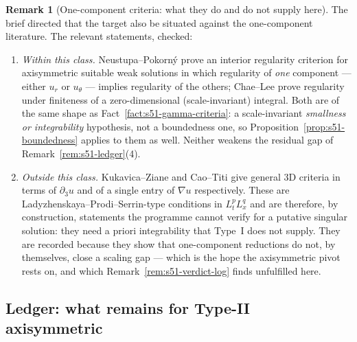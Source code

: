 \documentclass[11pt]{article}
\theoremstyle{definition}
\newtheorem{remark}[theorem]{Remark}
\theoremstyle{remark}
\begin{document}
\begin{remark}[One-component criteria: what they do and do not supply here]
  \label{rem:s51-onecomponent}
  The brief directed that the target also be situated against the
  one-component literature. The relevant statements, checked:
  \begin{enumerate}[label=\textup{(\alph*)},leftmargin=2.4em]
  \item \emph{Within this class.} Neustupa--Pokorn\'y
    \cite{NeustupaPokorny2000} prove an interior regularity criterion for
    axisymmetric suitable weak solutions in which regularity of \emph{one}
    component --- either $u_r$ or $u_\theta$ --- implies regularity of the
    others; Chae--Lee \cite{ChaeLee2002} prove regularity under finiteness of
    a zero-dimensional (scale-invariant) integral. Both are of the same shape
    as Fact~\ref{fact:s51-gamma-criteria}: a scale-invariant \emph{smallness
    or integrability} hypothesis, not a boundedness one, so
    Proposition~\ref{prop:s51-boundedness} applies to them as well. Neither
    weakens the residual gap of Remark~\ref{rem:s51-ledger}(4).
  \item \emph{Outside this class.} Kukavica--Ziane
    \cite{KukavicaZiane2006} and Cao--Titi \cite{CaoTiti2011} give general 3D
    criteria in terms of $\partial_3u$ and of a single entry of $\nabla u$
    respectively. These are Ladyzhenskaya--Prodi--Serrin-type conditions in
    $L^p_tL^q_x$ and are therefore, by construction, statements the programme
    cannot verify for a putative singular solution: they need a priori
    integrability that Type~I does not supply. They are recorded because they
    show that one-component reductions do not, by themselves, close a scaling
    gap --- which is the hope the axisymmetric pivot rests on, and which
    Remark~\ref{rem:s51-verdict-log} finds unfulfilled here.
  \end{enumerate}
\end{remark}

\subsection{Ledger: what remains for Type-II axisymmetric}
\label{subsec:s51-ledger}
\end{document}
